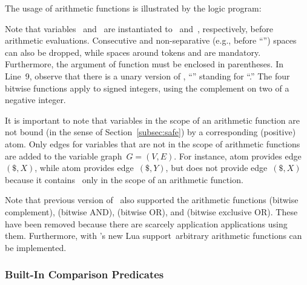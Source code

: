 \begin{example}\label{ex:arith:fun}
The usage of arithmetic functions is illustrated by the logic program:%
%

%
Note that variables~ and~ are instantiated to~ and~,
respectively, before arithmetic evaluations.
Consecutive and non-separative (e.g., before ``\code{(}'')
spaces can also be dropped,
while spaces around tokens  and  are mandatory.
Furthermore, the argument of function  must be enclosed in parentheses.
In Line~9, observe that there is a unary version of \code{-},
``'' standing for ``.''
The four bitwise functions apply to signed integers,
using the complement on two of a negative integer.
\eexample
\end{example}

\begin{newstuff}
It is important to note that variables
in the scope of an arithmetic function are not bound 
(in the sense of Section~\ref{subsec:safe}) by a corresponding (positive) atom.
Only edges for variables that are not in the scope of arithmetic functions
are added to the variable graph~$G=(V,E)$.
For instance, atom  provides edge~$(\$, X)$,
while atom  provides edge~$(\$, Y)$,
but does not provide edge~$(\$,X)$ because it contains~
only in the scope of an arithmetic function.

Note that previous version of \gringo\ also supported the arithmetic functions
\code{\textasciitilde} (bitwise complement),
\code{\&}  (bitwise AND),
   (bitwise OR), and
\code{\^} (bitwise exclusive OR).
These have been removed because there are scarcely application applications using them.
Furthermore, with \gringo's new Lua support\ arbitrary arithmetic functions can be implemented.
\end{newstuff}

\subsubsection{Built-In Comparison Predicates}\label{subsec:gringo:comp}

